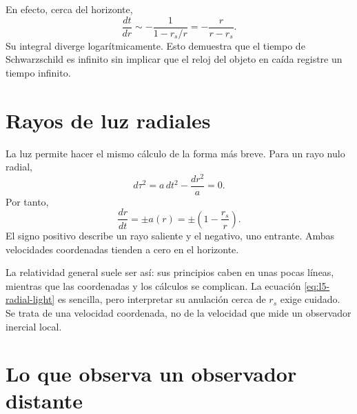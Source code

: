 En efecto, cerca del horizonte,
\begin{equation}
\frac{dt}{dr}
\sim-\frac{1}{1-r_s/r}
=-\frac{r}{r-r_s}.
\end{equation}
Su integral diverge logarítmicamente. Esto demuestra que el tiempo de Schwarzschild es infinito sin implicar que el reloj del objeto en caída registre un tiempo infinito.

\section{Rayos de luz radiales}

La luz permite hacer el mismo cálculo de la forma más breve. Para un rayo nulo radial,
\begin{equation}
d\tau^2
=a\,dt^2-\frac{dr^2}{a}=0.
\end{equation}
Por tanto,
\begin{equation}
\boxed{
\frac{dr}{dt}
=\pm a(r)
=\pm\left(1-\frac{r_s}{r}\right).
}
\label{eq:l5-radial-light}
\end{equation}
El signo positivo describe un rayo saliente y el negativo, uno entrante. Ambas velocidades coordenadas tienden a cero en el horizonte.

\begin{classroomqa}
\end{classroomqa}

La relatividad general suele ser así: sus principios caben en unas pocas líneas, mientras que las coordenadas y los cálculos se complican. La ecuación \eqref{eq:l5-radial-light} es sencilla, pero interpretar su anulación cerca de \(r_s\) exige cuidado. Se trata de una velocidad coordenada, no de la velocidad que mide un observador inercial local.

\section{Lo que observa un observador distante}

\begin{classroomqa}
\end{classroomqa}


